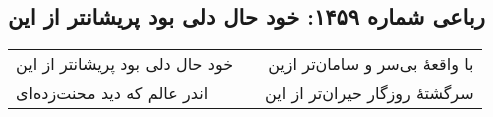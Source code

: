 \begin{center}
\section*{رباعی شماره ۱۴۵۹: خود حال دلی بود پریشانتر از این}
\label{sec:1459}
\begin{longtable}{l p{0.5cm} r}
خود حال دلی بود پریشانتر از این
&&
با واقعهٔ بی‌سر و سامان‌تر ازین
\\
اندر عالم که دید محنت‌زده‌ای
&&
سرگشتهٔ روزگار حیران‌تر از این
\\
\end{longtable}
\end{center}
